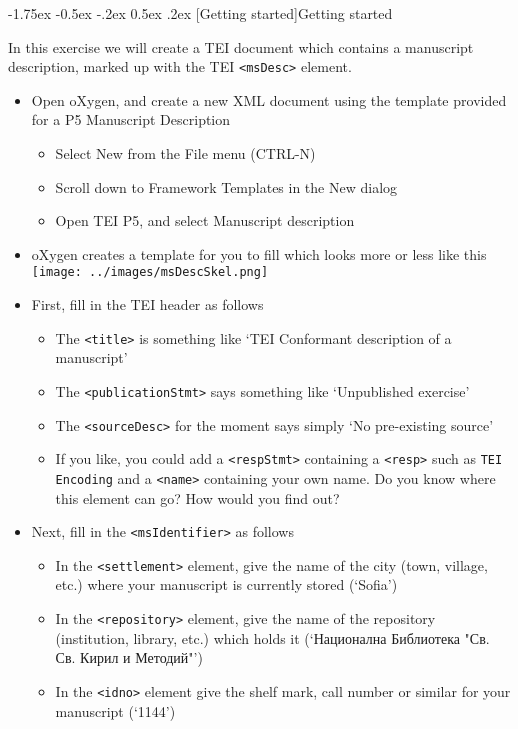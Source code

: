 \documentclass[11pt,twoside]{article}\makeatletter
\makeatletter
\renewcommand\section{\@startsection {section}{1}{\z@}%
     {-1.75ex \@plus -0.5ex \@minus -.2ex}%
     {0.5ex \@plus .2ex}%
     {\reset@font\Large\bfseries\sffamily}}
\makeatother
\begin{document}
\section[{Getting started}]{Getting started}\par
In this exercise we will create a TEI document which contains a manuscript description, marked up with the TEI \texttt{<msDesc>} element.\begin{itemize}
\item Open oXygen, and create a new XML document using the template provided for a P5 Manuscript Description \begin{itemize}
\item Select New from the File menu (CTRL-N)
\item Scroll down to Framework Templates in the New dialog
\item Open TEI P5, and select Manuscript description 
\end{itemize} 
\item oXygen creates a template for you to fill which looks more or less like this {\hskip1pt}\\{} \texttt{[image: ../images/msDescSkel.png]}
\item First, fill in the TEI header as follows \begin{itemize}
\item The \texttt{<title>} is something like ‘TEI Conformant description of a manuscript’
\item The \texttt{<publicationStmt>} says something like ‘Unpublished exercise’
\item The \texttt{<sourceDesc>} for the moment says simply ‘No pre-existing source’
\item If you like, you could add a \texttt{<respStmt>} containing a \texttt{<resp>} such as \texttt{TEI Encoding} and a \texttt{<name>} containing your own name. Do you know where this element can go? How would you find out?
\end{itemize} 
\item Next, fill in the \texttt{<msIdentifier>} as follows \begin{itemize}
\item In the \texttt{<settlement>} element, give the name of the city (town, village, etc.) where your manuscript is currently stored (‘Sofia’)
\item In the \texttt{<repository>} element, give the name of the repository (institution, library, etc.) which holds it (‘Национална Библиотека "Св. Св. Кирил и Методий"’)
\item In the \texttt{<idno>} element give the shelf mark, call number or similar for your manuscript (‘1144’)

\end{itemize}
\end{itemize}
\end{document}
